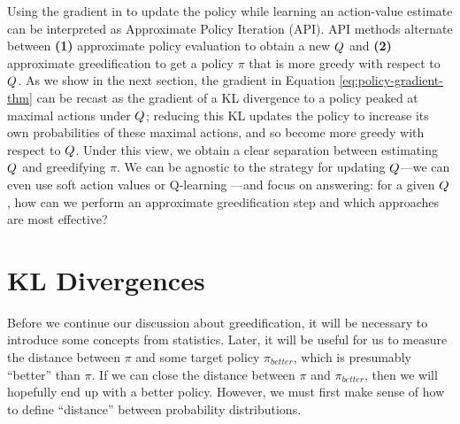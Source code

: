 \documentclass[\main/thesis.tex]{subfiles}
\begin{document}
Using the gradient in  to update the policy while learning an action-value estimate can be interpreted as Approximate Policy Iteration (API). API methods alternate between \textbf{(1)} approximate policy evaluation to obtain a new ${Q}$ and \textbf{(2)} approximate greedification to get a policy $\pi$ that is more greedy with respect to ${Q}$. As we show in the next section, the gradient in Equation \eqref{eq:policy-gradient-thm} can be recast as the gradient of a KL divergence to a policy peaked at maximal actions under ${Q}$; reducing this KL updates the policy to increase its own probabilities of these maximal actions, and so become more greedy with respect to ${Q}$. Under this view, we obtain a clear separation between estimating ${Q}$ and greedifying $\pi$. We can be agnostic to the strategy for updating ${Q}$---we can even use soft action values \citep{ziebart2010modeling} or Q-learning \citep{watkins1992q}---and focus on answering: for a given ${Q}$, how can we perform an approximate greedification step and which approaches are most effective? 
   


\section{KL Divergences}\label{sec:kl}
Before we continue our discussion about greedification, it will be necessary to introduce some concepts from statistics. Later, it will be useful for us to measure the distance between $\pi$ and some target policy $\pi_{better}$, which is presumably ``better'' than $\pi$. If we can close the distance between $\pi$ and $\pi_{better}$, then we will hopefully end up with a better policy. However, we must first make sense of how to define ``distance'' between probability distributions.
\end{document}
